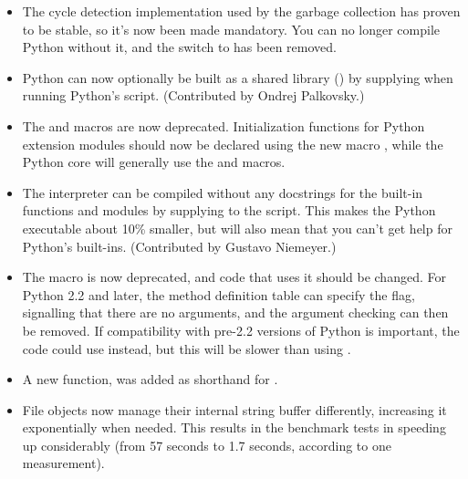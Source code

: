 \documentclass{howto}
\begin{document}
\begin{itemize}

\item The cycle detection implementation used by the garbage collection
has proven to be stable, so it's now been made mandatory.  You can no
longer compile Python without it, and the
 switch to  has been removed.

\item Python can now optionally be built as a shared library
() by supplying 
when running Python's  script.  (Contributed by Ondrej
Palkovsky.)

\item The  and  macros
are now deprecated.  Initialization functions for Python extension
modules should now be declared using the new macro
, while the Python core will generally
use the  and 
macros.

\item The interpreter can be compiled without any docstrings for
the built-in functions and modules by supplying
 to the  script.
This makes the Python executable about 10\% smaller, but will also
mean that you can't get help for Python's built-ins.  (Contributed by
Gustavo Niemeyer.)

\item The  macro is now deprecated, and code
that uses it should be changed.  For Python 2.2 and later, the method
definition table can specify the
 flag, signalling that there are no arguments, and
the argument checking can then be removed.  If compatibility with
pre-2.2 versions of Python is important, the code could use
 instead, but this will be slower
than using .

\item A new function,  was added as shorthand for
.

\item File objects now manage their internal string buffer
differently, increasing it exponentially when needed.  This results in
the benchmark tests in  speeding up
considerably (from 57 seconds to 1.7 seconds, according to one
measurement).


\end{itemize}
\end{document}
